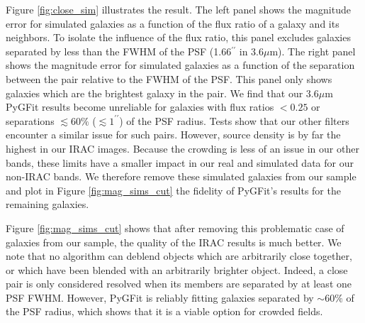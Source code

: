 \documentclass[apj]{emulateapj}
\newcommand{\sersic}{S\'{e}rsic}
\newcommand{\pygfit}{PyGFit}
\begin{document}
\begin{figure*}
\caption{\pygfit{} errors as measured with our simulations for our $3.6\mu$m galaxies with $[3.6] < 19.0$ versus the number of objects in the blend (top left), the distance to the nearest blended object (top right), the flux ratio between the object and its nearest neighbor (bottom right), and the fraction of the blend flux accounted for by the simulated object (bottom left).}\label{fig:ch1_error_correlations}
\end{figure*}


Figure \ref{fig:close_sim} illustrates the result.  The left panel shows the magnitude error for simulated galaxies as a function of the flux ratio of a galaxy and its neighbors.  To isolate the influence of the flux ratio, this panel excludes galaxies separated by less than the FWHM of the PSF (1.66$^{\prime\prime}$ in $3.6\mu$m).  The right panel shows the magnitude error for simulated galaxies as a function of the separation between the pair relative to the FWHM of the PSF.  This panel only shows galaxies which are the brightest galaxy in the pair.  We find that our $3.6\mu$m \pygfit{} results become unreliable for galaxies with flux ratios $<0.25$ or separations $\lesssim60\%$ ($\lesssim1^{\prime\prime}$) of the PSF radius.  Tests show that our other filters encounter a similar issue for such pairs.  However, source density is by far the highest in our IRAC images.  Because the crowding is less of an issue in our other bands, these limits have a smaller impact in our real and simulated data for our non-IRAC bands.  We therefore remove these simulated galaxies from our sample and plot in Figure \ref{fig:mag_sims_cut} the fidelity of \pygfit{}'s results for the remaining galaxies.

Figure \ref{fig:mag_sims_cut} shows that after removing this problematic case of galaxies from our sample, the quality of the IRAC results is much better.  We note that no algorithm can deblend objects which are arbitrarily close together, or which have been blended with an arbitrarily brighter object.  Indeed, a close pair is only considered resolved when its members are separated by at least one PSF FWHM.  However, \pygfit{} is reliably fitting galaxies separated by $\sim60\%$ of the PSF radius, which shows that it is a viable option for crowded fields.
\end{document}
